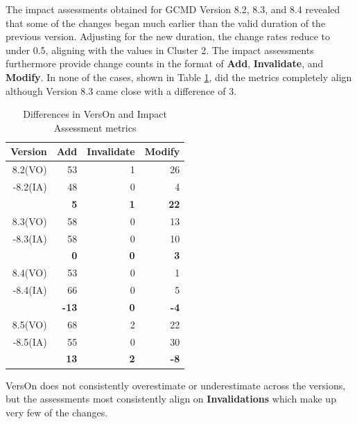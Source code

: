 The impact assessments obtained for GCMD Version 8.2, 8.3, and 8.4 revealed that some of the changes began much earlier than the valid duration of the previous version.
Adjusting for the new duration, the change rates reduce to under 0.5, aligning with the values in Cluster 2.
The impact assessments furthermore provide change counts in the format of \textbf{Add}, \textbf{Invalidate}, and \textbf{Modify}.
In none of the cases, shown in Table \ref{table:GCMD_metric}, did the metrics completely align although Version 8.3 came close with a difference of 3.
\begin{table}
	\caption{Differences in VersOn and Impact Assessment metrics}
	\label{table:GCMD_metric}
	\centering
	\begin{tabular}{|r|r|r|r|}
		\hline
		Version & Add & Invalidate & Modify\\ \hline
		8.2(VO)&	53&	1&	26\\
		-8.2(IA)&	48&	0&	4\\
		\hline
		&	\textbf{5}&	\textbf{1}&	\textbf{22}\\
		\hline
		8.3(VO)&	58&	0&	13\\
		-8.3(IA)&	58&	0&	10\\
		\hline
		&	\textbf{0}&	\textbf{0}&	\textbf{3}\\
		\hline
		8.4(VO)&	53&	0&	1\\
		-8.4(IA)&	66&	0&	5\\
		\hline
		&	\textbf{-13}&	\textbf{0}&	\textbf{-4}\\
		\hline
		8.5(VO)&	68&	2&	22\\
		-8.5(IA)&	55&	0&	30\\
		\hline
		&	\textbf{13}&	\textbf{2}&	\textbf{-8}\\						
		\hline
	\end{tabular}
\end{table}
VersOn does not consistently overestimate or underestimate across the versions, but the assessments most consistently align on \textbf{Invalidations} which make up very few of the changes.

